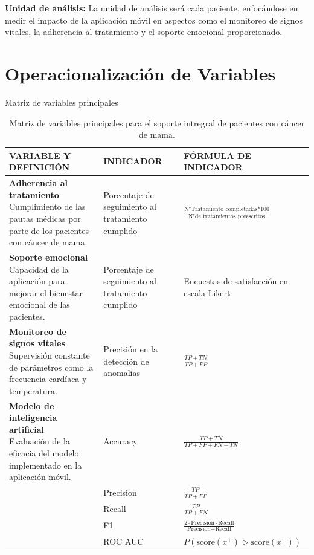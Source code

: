 \textbf{Unidad de análisis:}
La unidad de análisis será cada paciente, enfocándose en medir el impacto de la aplicación móvil en aspectos como el monitoreo de signos vitales, la adherencia al tratamiento y el soporte emocional proporcionado.

\section{Operacionalización de Variables}
Matriz de variables principales

\begin{table}[H]
\centering
\renewcommand{\arraystretch}{1.8} %
\setlength{\tabcolsep}{5pt} %
\begin{tabular}{|p{5cm}|p{4cm}|p{6cm}|}
\hline
\textbf{VARIABLE Y DEFINICIÓN} & \textbf{INDICADOR} & \textbf{FÓRMULA DE INDICADOR} \\ \hline

\parbox[t]{5cm}{\textbf{Adherencia al tratamiento} \\ Cumplimiento de las pautas médicas por parte de los pacientes con cáncer de mama.} 
& Porcentaje de seguimiento al tratamiento cumplido & 
$\frac{\text{N°Tratamiento completadas*100}}{\text{N°de tratamientos preescritos}}$ \\ \hline

\parbox[t]{5cm}{\textbf{Soporte emocional} \\ Capacidad de la aplicación para mejorar el bienestar emocional de las pacientes.} 
& Porcentaje de seguimiento al tratamiento cumplido & Encuestas de satisfacción en escala Likert \\ \hline

\parbox[t]{5cm}{\textbf{Monitoreo de signos vitales} \\ Supervisión constante de parámetros como la frecuencia cardíaca y temperatura.} 
& Precisión en la detección de anomalías & $\frac{TP+TN}{TP + FP}$ \\ \hline

\parbox[t]{5cm}{\textbf{Modelo de inteligencia artificial} \\ Evaluación de la eficacia del modelo implementado en la aplicación móvil.} 
& Accuracy & $\frac{TP + TN}{TP + FP + FN + TN}$ \\ 
& Precision & $\frac{TP}{TP + FP}$ \\ 
& Recall & $\frac{TP}{TP + FN}$ \\ 
& F1 & $\frac{2 \cdot \text{Precision} \cdot \text{Recall}}{\text{Precision} + \text{Recall}}$ \\ 
& ROC AUC & $P(\text{score}(x^+) > \text{score}(x^-))$ \\ \hline

\end{tabular}
\caption{Matriz de variables principales para el soporte intregral de pacientes con cáncer de mama.}
\label{table:variables}
\end{table}

